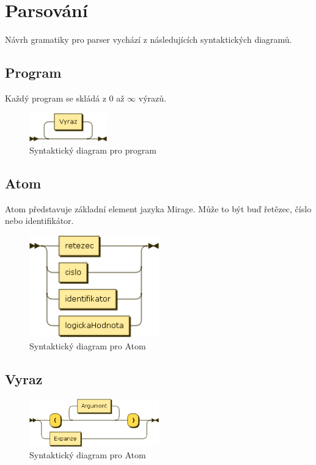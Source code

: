 \documentclass[a4paper,11pt]{article}
\begin{document}
\section{Parsování}
Návrh gramatiky pro parser vychází z následujících syntaktických diagramů.
\newpage
\subsection{Program}
Každý program se skládá z 0 až $\infty$ výrazů.

\begin{figure}[!h]
    \centering
    \includegraphics[width=0.3\textwidth]{obrazky/Program.png}
    \caption{Syntaktický diagram pro program}
    \label{fig:Syntaktický diagram pro program}
\end{figure}

\subsection{Atom}
Atom představuje základní element jazyka Mirage. Může to být buď řetězec, číslo nebo identifikátor.
\begin{figure}[!h]
    \centering
    \includegraphics[width=0.5\textwidth]{obrazky/Atom.png}
    \caption{Syntaktický diagram pro Atom}
    \label{fig:Syntaktický diagram pro Atom}
\end{figure}

\newpage
\subsection{Vyraz}
\begin{figure}[!h]
    \centering
    \includegraphics[width=0.5\textwidth]{obrazky/Vyraz.png}
    \caption{Syntaktický diagram pro Atom}
    \label{fig:Syntaktický diagram pro Atom}
\end{figure}
\end{document}
